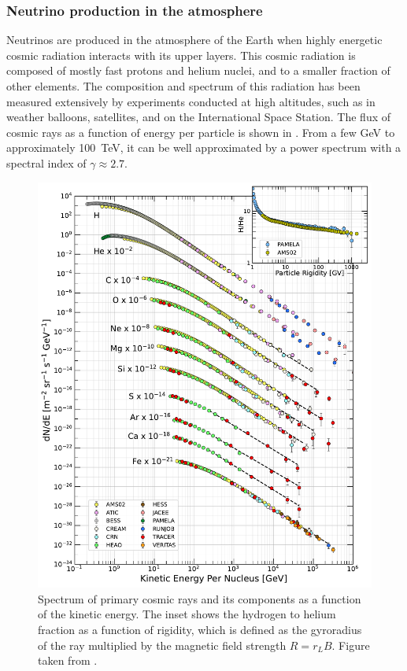\subsubsection{Neutrino production in the atmosphere}
Neutrinos are produced in the atmosphere of the Earth when highly energetic cosmic radiation interacts with its upper layers. This cosmic radiation is composed of mostly fast protons and helium nuclei, and to a smaller fraction of other elements. The composition and spectrum of this radiation has been measured extensively by experiments conducted at high altitudes, such as in weather balloons, satellites, and on the International Space Station. The flux of cosmic rays as a function of energy per particle is shown in . From a few GeV to approximately \SI{100}{TeV}, it can be well approximated by a power spectrum with a spectral index of $\gamma \approx 2.7$.
\begin{figure}
    \centering
    \includegraphics{figures/flux/2021_Figure_1_Inset_v1.pdf}
    \caption{Spectrum of primary cosmic rays and its components as a function of the kinetic energy. The inset shows the hydrogen to helium fraction as a function of rigidity, which is defined as the gyroradius of the ray multiplied by the magnetic field strength $R=r_L B$. Figure taken from \cite{pdg}.\label{fig:cr-primary-flux}}
\end{figure}
